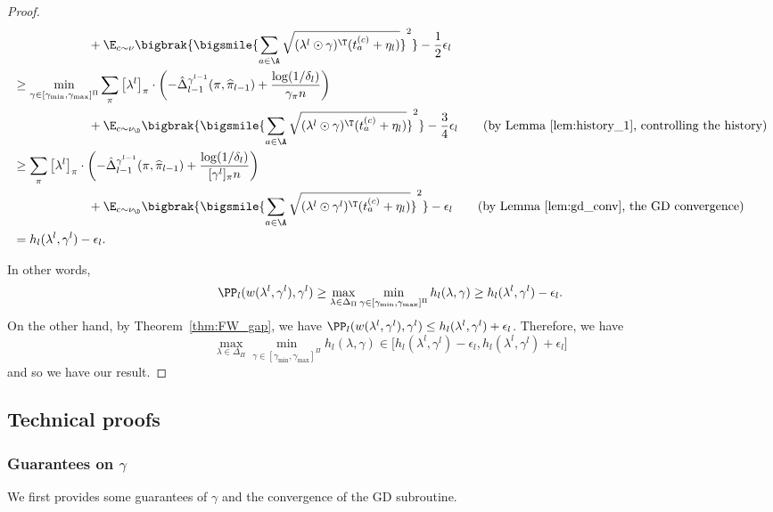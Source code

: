 \documentclass{article}
\newcommand{\pill}{\widehat{\pi}_{l-1}}
\newcommand{\1}{\mathbf{1}}
\begin{document}
\begin{proof}
\begin{align*}
    &\qquad\qquad\qquad+\E_{c\sim\nu}\bigbrak{\bigsmile{\sum_{a\in\A}\sqrt{(\lambda^{l}\odot \gamma)^\T (t_a^{(c)}+\eta_l)}}^2}-\frac{1}{2}\epsilon_l\\
    &\geq \min _{\gamma \in [\gamma_{\min},\gamma_{\max}]^{\Pi}} \sum_{\pi}\left[\lambda^{l}\right]_{\pi} \cdot\left(-\hat{\Delta}_{l-1}^{\gamma^{l-1}}(\pi,\pill)+\frac{\log(1 / \delta_l)}{\gamma_{\pi} n}\right)\\
    &\qquad\qquad\qquad+\E_{c\sim\nu_\D}\bigbrak{\bigsmile{\sum_{a\in\A}\sqrt{(\lambda^{l}\odot \gamma)^\T (t_a^{(c)}+\eta_l)}}^2}-\frac{3}{4}\epsilon_l\tag{by Lemma~\ref{lem:history_1}, controlling the history}\\
    &\geq \sum_{\pi}\left[\lambda^{l}\right]_{\pi} \cdot\left(-\hat{\Delta}_{l-1}^{\gamma^{l-1}}(\pi,\pill)+\frac{\log(1 / \delta_l)}{[\gamma^l]_{\pi} n}\right)\\
    &\qquad\qquad\qquad+\E_{c\sim\nu_\D}\bigbrak{\bigsmile{\sum_{a\in\A}\sqrt{(\lambda^{l}\odot \gamma^l)^\T (t_a^{(c)}+\eta_l)}}^2}-\epsilon_l\tag{by Lemma~\ref{lem:gd_conv}, the GD convergence}\\
    &= h_l(\lambda^{l},\gamma^l)-\epsilon_l. 
\end{align*}
\endgroup

In other words, 
\[\PP_l(w(\lambda^{l},\gamma^l),\gamma^l)\geq \max_{\lambda\in\Delta_\Pi}\min_{\gamma\in[\gamma_{\min},\gamma_{\max}]^\Pi} h_l(\lambda,\gamma)\geq h_l(\lambda^{l},\gamma^l)-\epsilon_l.\]
On the other hand, by Theorem~\ref{thm:FW_gap}, we have $\PP_l(w(\lambda^{l},\gamma^l),\gamma^l)\leq h_l(\lambda^{l},\gamma^l)+\epsilon_l$. Therefore, we have \[\max_{\lambda\in\Delta_\Pi}\min_{\gamma\in[\gamma_{\min},\gamma_{\max}]^\Pi} h_l(\lambda,\gamma)\in\Big[h_l(\lambda^{l},\gamma^l)-\epsilon_l,h_l(\lambda^{l},\gamma^l)+\epsilon_l\Big]\] and so we have our result. 
\end{proof}

\subsection{Technical proofs}

\subsubsection{Guarantees on \texorpdfstring{$\gamma$}{gamma}}

We first provides some guarantees of $\gamma$ and the convergence of the \textsf{GD} subroutine. 
\end{document}
